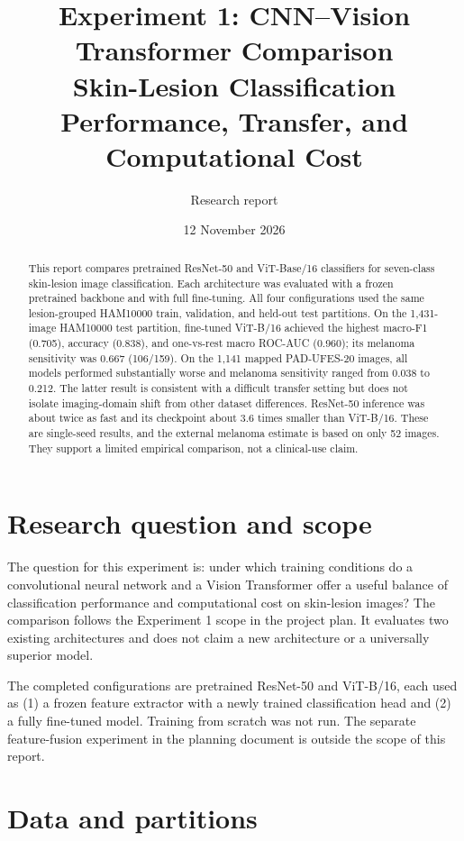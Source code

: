 \documentclass[11pt]{article}
\title{\textbf{Experiment 1: CNN--Vision Transformer Comparison}\\
\large Skin-Lesion Classification Performance, Transfer, and Computational Cost}
\author{Research report}
\date{12 November 2026}
\begin{document}
\maketitle

\begin{abstract}
This report compares pretrained ResNet-50 and ViT-Base/16 classifiers for seven-class skin-lesion image classification. Each architecture was evaluated with a frozen pretrained backbone and with full fine-tuning. All four configurations used the same lesion-grouped HAM10000 train, validation, and held-out test partitions. On the 1,431-image HAM10000 test partition, fine-tuned ViT-B/16 achieved the highest macro-F1 (0.705), accuracy (0.838), and one-vs-rest macro ROC-AUC (0.960); its melanoma sensitivity was 0.667 (106/159). On the 1,141 mapped PAD-UFES-20 images, all models performed substantially worse and melanoma sensitivity ranged from 0.038 to 0.212. The latter result is consistent with a difficult transfer setting but does not isolate imaging-domain shift from other dataset differences. ResNet-50 inference was about twice as fast and its checkpoint about 3.6 times smaller than ViT-B/16. These are single-seed results, and the external melanoma estimate is based on only 52 images. They support a limited empirical comparison, not a clinical-use claim.
\end{abstract}

\section{Research question and scope}

The question for this experiment is: under which training conditions do a convolutional neural network and a Vision Transformer offer a useful balance of classification performance and computational cost on skin-lesion images? The comparison follows the Experiment 1 scope in the project plan. It evaluates two existing architectures and does not claim a new architecture or a universally superior model.

The completed configurations are pretrained ResNet-50 and ViT-B/16, each used as (1) a frozen feature extractor with a newly trained classification head and (2) a fully fine-tuned model. Training from scratch was not run. The separate feature-fusion experiment in the planning document is outside the scope of this report.

\section{Data and partitions}
\end{document}
